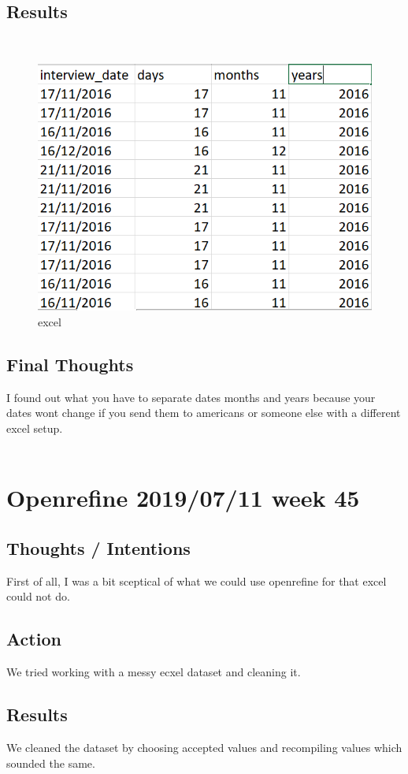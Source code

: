 \documentclass{article}
\begin{document}
\subsection{Results}\
\begin{figure}[H]
    \centering
    \includegraphics[width=\textwidth]{foto excel.PNG}
    \caption{excel}
    \label{fig:bil4}
\end{figure}
\subsection{Final Thoughts} I found out what you have to separate dates months and years because your dates wont change if you send them to americans or someone else with a different excel setup. \\\\

\section{Openrefine 2019/07/11 week 45}
\subsection{Thoughts / Intentions} First of all, I was a bit sceptical of what we could use openrefine for that excel could not do. 
\subsection{Action} We tried working with a messy ecxel dataset and cleaning it. 
\subsection{Results} We cleaned the dataset by choosing accepted values and recompiling values which sounded the same. 
\end{document}
